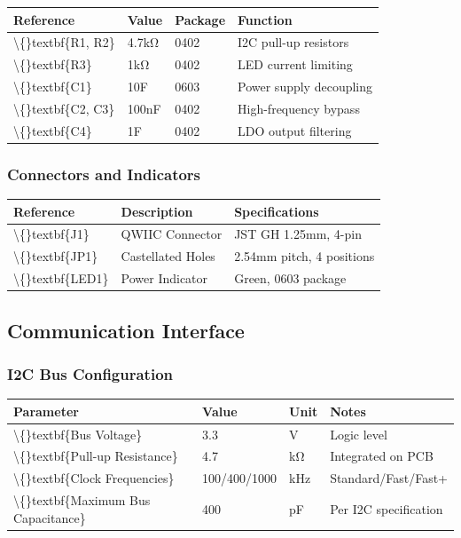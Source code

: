 \documentclass[11pt,a4paper]{article}
\begin{document}
\begin{table}[H]
\centering
\begin{tabular}{llll}
\toprule
Reference & Value & Package & Function \\
\midrule
\textbackslash\{\}textbf\{R1, R2\} & 4.7kΩ & 0402 & I2C pull-up resistors \\
\textbackslash\{\}textbf\{R3\} & 1kΩ & 0402 & LED current limiting \\
\textbackslash\{\}textbf\{C1\} & 10\textmu{}F & 0603 & Power supply decoupling \\
\textbackslash\{\}textbf\{C2, C3\} & 100nF & 0402 & High-frequency bypass \\
\textbackslash\{\}textbf\{C4\} & 1\textmu{}F & 0402 & LDO output filtering \\
\bottomrule
\end{tabular}
\end{table}


\subsubsection{Connectors and Indicators}

\begin{table}[H]
\centering
\begin{tabular}{lll}
\toprule
Reference & Description & Specifications \\
\midrule
\textbackslash\{\}textbf\{J1\} & QWIIC Connector & JST GH 1.25mm, 4-pin \\
\textbackslash\{\}textbf\{JP1\} & Castellated Holes & 2.54mm pitch, 4 positions \\
\textbackslash\{\}textbf\{LED1\} & Power Indicator & Green, 0603 package \\
\bottomrule
\end{tabular}
\end{table}


\subsection{Communication Interface}

\subsubsection{I2C Bus Configuration}

\begin{table}[H]
\centering
\begin{tabular}{llll}
\toprule
Parameter & Value & Unit & Notes \\
\midrule
\textbackslash\{\}textbf\{Bus Voltage\} & 3.3 & V & Logic level \\
\textbackslash\{\}textbf\{Pull-up Resistance\} & 4.7 & kΩ & Integrated on PCB \\
\textbackslash\{\}textbf\{Clock Frequencies\} & 100/400/1000 & kHz & Standard/Fast/Fast+ \\
\textbackslash\{\}textbf\{Maximum Bus Capacitance\} & 400 & pF & Per I2C specification \\
\bottomrule
\end{tabular}
\end{table}
\end{document}
